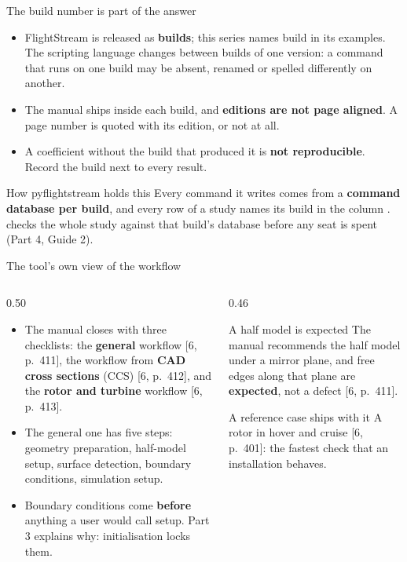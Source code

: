 \begin{frame}{The build number is part of the answer}
\begin{itemize}\small
  \item FlightStream is released as \textbf{builds}; this series names build
        \fsbuild{} in its examples. The scripting language changes between
        builds of one version: a command that runs on one build may be absent,
        renamed or spelled differently on another.
  \item The manual ships inside each build, and \textbf{editions are not page
        aligned}. A page number is quoted with its edition, or not at all.
  \item A coefficient without the build that produced it is \textbf{not
        reproducible}. Record the build next to every result.
\end{itemize}
\begin{block}{How pyflightstream holds this}
\small Every command it writes comes from a \textbf{command database per
build}, and every row of a study names its build in the column
.  checks the whole study against that build's
database before any seat is spent (Part 4, Guide 2).
\end{block}
\end{frame}

\begin{frame}{The tool's own view of the workflow}
\begin{columns}[T]
\begin{column}{0.50\textwidth}
\begin{itemize}\small
  \item The manual closes with three checklists: the \textbf{general}
        workflow [6, p.~411], the workflow from \textbf{CAD cross sections}
        (CCS) [6, p.~412], and the \textbf{rotor and turbine} workflow
        [6, p.~413].
  \item The general one has five steps: geometry preparation, half-model
        setup, surface detection, boundary conditions, simulation setup.
  \item Boundary conditions come \textbf{before} anything a user would call
        setup. Part 3 explains why: initialisation locks them.
\end{itemize}
\end{column}
\begin{column}{0.46\textwidth}
\begin{block}{A half model is expected}
\small The manual recommends the half model under a mirror plane, and free
edges along that plane are \textbf{expected}, not a defect [6, p.~411].
\end{block}
\begin{block}{A reference case ships with it}
\small A rotor in hover and cruise [6, p.~401]: the fastest check that an
installation behaves.
\end{block}
\end{column}
\end{columns}
\end{frame}

